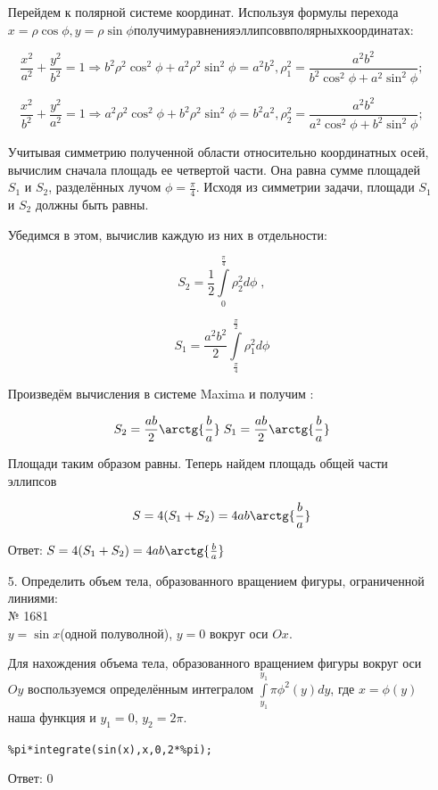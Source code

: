 \documentclass[article, bachelor, och, pract]{SCWorks}
\begin{document}
\begin{itemize}
Перейдем к полярной системе координат. Используя формулы перехода $x=\rho\cos{\phi}, y=\rho\sin{\phi} получим уравнения эллипсов в полярных координатах:$

$$\frac{x^2}{a^2}+\frac{y^2}{b^2}=1 \Rightarrow b^2\rho^2\cos^2{\phi}+a^2\rho^2\sin^2{\phi}=a^2b^2, \rho_1^2=\frac{a^2b^2}{b^2\cos^2{\phi}+a^2\sin^2{\phi}};$$

$$\frac{x^2}{b^2}+\frac{y^2}{a^2}=1 \Rightarrow a^2\rho^2\cos^2{\phi}+b^2\rho^2\sin^2{\phi}=b^2a^2, \rho_2^2=\frac{a^2b^2}{a^2\cos^2{\phi}+b^2\sin^2{\phi}};$$

Учитывая симметрию полученной области относительно координатных осей, вычислим сначала площадь ее четвертой части. Она равна сумме площадей $S_1$ и $S_2$, разделённых лучом $\phi=\frac{\pi}{4}$. Исходя из симметрии задачи, площади $S_1$ и $S_2$ должны быть равны. 

Убедимся в этом, вычислив каждую из них в отдельности:

$$S_2=\frac{1}{2}\int\limits_{0}^{\frac{\pi}{4}} \rho_2^2d\phi \; ,$$

$$S_1=\frac{a^2b^2}{2}\int\limits_{\frac{\pi}{4}}^{\frac{\pi}{2}} \rho_1^2d\phi$$

Произведём вычисления в системе Maxima и получим : 

$$S_2=\frac{ab}{2}\arctg{\frac{b}{a}} \; S_1=\frac{ab}{2}\arctg{\frac{b}{a}}$$

Площади таким образом равны. Теперь найдем площадь общей части эллипсов

$$S=4(S_1+S_2)=4ab\arctg{\frac{b}{a}}$$

Ответ: $S=4(S_1+S_2)=4ab\arctg{\frac{b}{a}}$

\item[5.] Определить объем тела, образованного вращением фигуры, ограниченной линиями:\\

№ 1681 \\
$y = \sin{x}$(одной полуволной), $y=0$ вокруг оси $Ox$.

Для нахождения объема тела, образованного вращением фигуры вокруг оси $Oy$ воспользуемся определённым интегралом $\int\limits_{y_1}^{y_1} \pi \phi^2(y)dy$, где $x=\phi(y)$ наша функция и $y_1=0$, $y_2=2\pi$.

\texttt{\%pi*integrate(sin(x),x,0,2*\%pi);}

Ответ: $0$

\end{itemize}

\newpage
\end{document}

